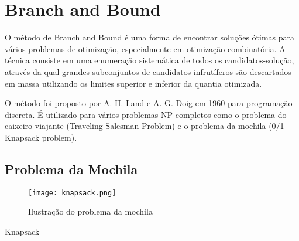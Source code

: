 \section{Branch and Bound} \label{sec:branch-and-bound}

O método de Branch and Bound é uma forma de 
encontrar soluções ótimas para vários problemas de otimização, especialmente em 
otimização combinatória. A técnica consiste em uma enumeração sistemática de todos os candidatos-solução, 
através da qual grandes subconjuntos de candidatos infrutíferos são 
descartados em massa utilizando os limites superior e inferior da quantia otimizada.

O método foi proposto por A. H. Land e A. G. Doig em 1960 para programação discreta.
É utilizado para vários problemas NP-completos como o problema do caixeiro viajante (Traveling Salesman Problem)
e o problema da mochila (0/1 Knapsack problem). 

\subsection{Problema da Mochila}

\begin{figure}[ht]
    \centering
    \texttt{[image: knapsack.png]}
    \caption{Ilustração do problema da mochila}
    \label{fig:knapsack}
\end{figure}

\begin{algorithm}
    \caption{Knapsack}
    \begin{algorithmic}[1]
    \EndIf
    \EndFor
    \EndProcedure
    \EndIf
    \EndFor
    \EndProcedure
    \end{algorithmic}
  \end{algorithm}

  \nocite{branch-and-bound}
  \nocite{knapsacker}

  \newpage